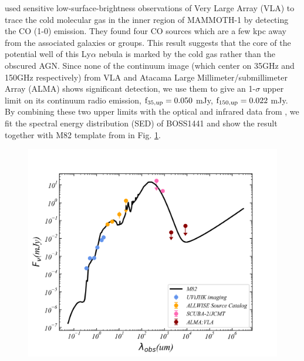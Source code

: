 \documentclass[../Results.tex]{subfiles}
\begin{document}
	\cite{emonts2019cold} used sensitive low-surface-brightness observations of Very Large Array (VLA) to trace the cold molecular gas in the inner region of MAMMOTH-1 by detecting the CO (1-0) emission. They found four CO sources which are a few kpc away from the associated galaxies or groups. This result suggests that the core of the potential well of this Ly$\alpha$ nebula is marked by the cold gas rather than the obscured AGN. Since none of the continuum image (which center on 35GHz and 150GHz respectively) from VLA and Atacama Large Millimeter/submillimeter Array (ALMA) shows significant detection, we use them to give an 1-$\sigma$ upper limit on its continuum radio emission, $\rm f_{35,up}=0.050$ mJy, $\rm f_{150,up}=0.022$ mJy. By combining these two upper limits with the optical and infrared data from \citet{arrigoni2018overdensity}, we fit the spectral energy distribution (SED) of BOSS1441 and show the result together with M82 template from \cite{Silva_1998} in Fig. \ref{SED}. 
	
	\begin{figure}[htp]
		\centering
		\includegraphics[width=\columnwidth]{figs/SED_fitting}
		\label{SED}
	\end{figure}
	
\end{document}
